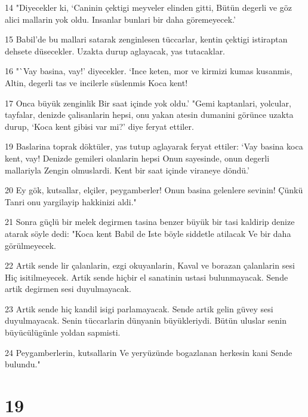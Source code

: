 \par 14 "Diyecekler ki, `Caninin çektigi meyveler elinden gitti, Bütün degerli ve göz alici mallarin yok oldu. Insanlar bunlari bir daha göremeyecek.'
\par 15 Babil'de bu mallari satarak zenginlesen tüccarlar, kentin çektigi istiraptan dehsete düsecekler. Uzakta durup aglayacak, yas tutacaklar.
\par 16 "`Vay basina, vay!' diyecekler. `Ince keten, mor ve kirmizi kumas kusanmis, Altin, degerli tas ve incilerle süslenmis Koca kent!
\par 17 Onca büyük zenginlik Bir saat içinde yok oldu.' "Gemi kaptanlari, yolcular, tayfalar, denizde çalisanlarin hepsi, onu yakan atesin dumanini görünce uzakta durup, `Koca kent gibisi var mi?' diye feryat ettiler.
\par 19 Baslarina toprak döktüler, yas tutup aglayarak feryat ettiler: `Vay basina koca kent, vay! Denizde gemileri olanlarin hepsi Onun sayesinde, onun degerli mallariyla Zengin olmuslardi. Kent bir saat içinde viraneye döndü.'
\par 20 Ey gök, kutsallar, elçiler, peygamberler! Onun basina gelenlere sevinin! Çünkü Tanri onu yargilayip hakkinizi aldi."
\par 21 Sonra güçlü bir melek degirmen tasina benzer büyük bir tasi kaldirip denize atarak söyle dedi: "Koca kent Babil de Iste böyle siddetle atilacak Ve bir daha görülmeyecek.
\par 22 Artik sende lir çalanlarin, ezgi okuyanlarin, Kaval ve borazan çalanlarin sesi Hiç isitilmeyecek. Artik sende hiçbir el sanatinin ustasi bulunmayacak. Sende artik degirmen sesi duyulmayacak.
\par 23 Artik sende hiç kandil isigi parlamayacak. Sende artik gelin güvey sesi duyulmayacak. Senin tüccarlarin dünyanin büyükleriydi. Bütün uluslar senin büyücülügünle yoldan sapmisti.
\par 24 Peygamberlerin, kutsallarin Ve yeryüzünde bogazlanan herkesin kani Sende bulundu."

\chapter{19}

